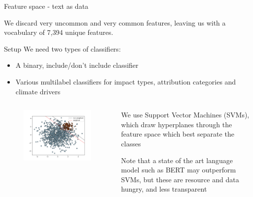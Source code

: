 \documentclass[9pt]{beamer}
\begin{document}
\begin{frame}{Feature space - text as data}
\medskip

We discard very uncommon and very common features, leaving us with a vocabulary of 7,394 unique features.

\end{frame}

\begin{frame}{Setup}
We need two types of classifiers:
\begin{itemize}
	\item A binary, include/don't include classifier
	\item Various multilabel classifiers for impact types, attribution categories and climate drivers
\end{itemize}

\begin{columns}
	\begin{column}{0.618\linewidth}
		\begin{figure}
			\includegraphics[width=\linewidth]{images/svc_sklearn_unbalanced.png}
		\end{figure}
	\end{column}
	\begin{column}{0.382\linewidth}
		We use Support Vector Machines (SVMs), which draw hyperplanes through the feature space which best separate the classes
		
		\bigskip
		
		Note that a state of the art language model such as BERT may outperform SVMs, but these are resource and data hungry, and less transparent
	\end{column}
\end{columns}

\end{frame}
\end{document}
